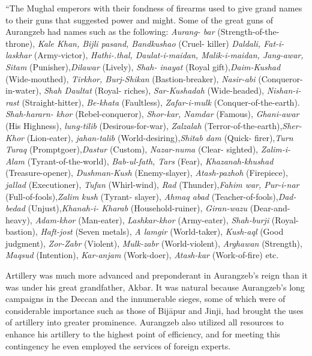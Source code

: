 “The Mughal emperors with their fondness of firearms used to give grand names to their guns that suggested power and might. Some of the great guns of Aurangzeb had names such as the following: {\it Aurang- bar} (Strength-of-the-throne), {\it Kale Khan, Bijli pasand, Bandkushao} (Cruel- killer) {\it Daldali, Fat-i-laskhar} (Army-victor), {\it Hathi-.thal, Daulat-i-maidan, Malik-i-maidan, Jang-awar, Sitam} (Punisher),{\it Dilawar} (Lively), {\it Shah- inayat} (Royal gift),{\it Daim-Kushad} (Wide-mouthed), {\it Tirkhor, Burj-Shikan} (Bastion-breaker), {\it Nasir-abi} (Conqueror-in-water), {\it Shah Daultat} (Royal- riches), {\it Sar-Kushadah} (Wide-headed), {\it Nishan-i-rast} (Straight-hitter), {\it Be-khata} (Faultless), {\it Zafar-i-mulk} (Conquer-of-the-earth). {\it Shah-hararn- khor} (Rebel-conqueror), {\it Shor-kar, Namdar} (Famous), {\it Ghani-awar} (His Highness), {\it lung-tilib} (Desirous-for-war), {\it Zalzalah} (Terror-of-the-earth),{\it Sher-Khor} (Lion-eater), {\it jahan-talib} (World-desiring),{\it Shitab dam} (Quick- firer),{\it Turn Turaq} (Promptgoer),{\it Dastur} (Custom), {\it Nazar-numa} (Clear- sighted), {\it Zalim-i-Alam} (Tyrant-of-the-world), {\it Bab-ul-fath, Tars} (Fear), {\it Khazanah-khushad} (Treasure-opener), {\it Dushman-Kush} (Enemy-slayer), {\it Atash-pazhoh} (Firepiece), {\it jallad} (Executioner), {\it Tufan} (Whirl-wind), {\it Rad} (Thunder),{\it Fahim war, Pur-i-nar} (Full-of-fools),{\it Zalim kush} (Tyrant- slayer), {\it Ahmaq abad} (Teacher-of-fools),{\it Dad-bedad} (Unjust),{\it Khanah-i- Kharab} (Household-ruiner), {\it Giran-wazu} (Dear-and-heavy), {\it Adam-khor} (Man-eater), {\it Lashkar-khor} (Army-eater), {\it Shah-burji} (Royal-bastion), {\it Haft-jost} (Seven metals), {\it A lamgir} (World-taker), {\it Kush-aql} (Good judgment), {\it Zor-Zabr} (Violent), {\it Mulk-zabr} (World-violent), {\it Arghawan} (Strength), {\it Maqsud} (Intention), {\it Kar-anjam } (Work-doer), {\it Atash-kar} (Work-of-fire) etc.

Artillery was much more advanced and preponderant in Aurangzeb's reign than it was under his great grandfather,  Akbar.  It was natural because Aurangzeb’s long campaigns in the Deccan and the innumerable sieges, some of which were of considerable importance such as those of Bijāpur and Jinji, had brought the uses of artillery into greater prominence. Aurangzeb also utilized all resources to enhance his artillery to the highest point of efficiency, and for meeting this contingency he even employed the services of foreign experts.


